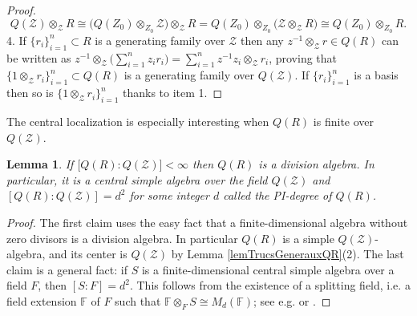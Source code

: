 \documentclass[11pt]{amsart}
\newtheorem{lem}[teo]{Lemma}
\begin{document}
\begin{proof}
\[ Q(\mathcal{Z}) \otimes_{\mathcal{Z}} R \cong \bigl( Q(Z_0) \otimes_{Z_0} \mathcal{Z} \bigr) \otimes_{\mathcal{Z}} R = Q(Z_0) \otimes_{Z_0} \bigl( \mathcal{Z} \otimes_{\mathcal{Z}} R \bigr) \cong Q(Z_0) \otimes_{Z_0} R. \]
4. If $\{r_i\}_{i=1}^n \subset R$ is a generating family over $\mathcal{Z}$ then any $z^{-1} \otimes_{\mathcal{Z}} r \in Q(R)$ can be written as $z^{-1} \otimes_{\mathcal{Z}} \bigl( \textstyle \sum_{i=1}^n z_ir_i \bigr) = \textstyle \sum_{i=1}^n z^{-1}z_i \otimes_{\mathcal{Z}} r_i$, proving that $\{1 \otimes_{\mathcal{Z}} r_i\}_{i=1}^n \subset Q(R)$ is a generating family over $Q(\mathcal{Z})$. If $\{r_i\}_{i=1}^n$ is a basis then so is $\{1 \otimes_{\mathcal{Z}} r_i\}_{i=1}^n$ thanks to item 1.
\end{proof}

\indent The central localization is especially interesting when $Q(R)$ is finite over $Q(\mathcal{Z})$.
\begin{lem}\label{lemQRCSA}
If $\bigl[ Q(R):Q(\mathcal{Z}) \bigr] < \infty$ then $Q(R)$ is a division algebra. In particular, it is a central simple algebra over the field $Q(\mathcal{Z})$ and $[Q(R) : Q(\mathcal{Z})]=d^2$ for some integer $d$ called the {\em PI-degree} of $Q(R)$.
\end{lem}
\begin{proof}
The first claim uses the easy fact that a finite-dimensional algebra without zero divisors is a division algebra. In particular $Q(R)$ is a simple $Q(\mathcal{Z})$-algebra, and its center is $Q(\mathcal{Z})$ by Lemma \ref{lemTrucsGenerauxQR}(2). The last claim is a general fact: if $S$ is a finite-dimensional central simple algebra over a field $F$, then $[S : F] = d^2$. This follows from the existence of a splitting field, i.e. a field extension $\mathbb{F}$ of $F$ such that $\mathbb{F} \otimes_F S \cong M_d(\mathbb{F})$; see e.g. \cite[Cor.\,2.3.25]{Rowen} or \cite[\S 13.3]{MC-R}.
\end{proof}
\end{document}
